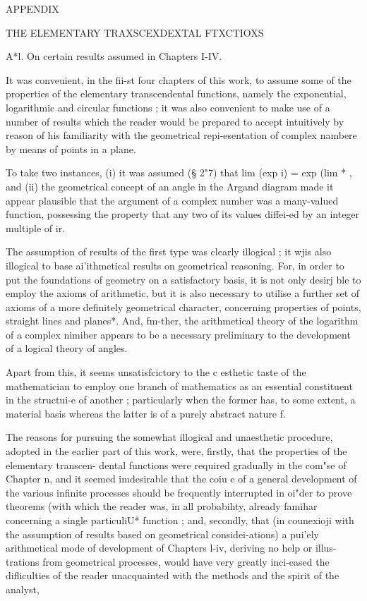 
APPENDIX 

THE ELEMENTARY TRAXSCEXDEXTAL FTXCTIOXS 

A*l. On certain results assumed in Chapters I-IV. 

It was conveuient, in the fii-st four chapters of this work, to assume some of the 
properties of the elementary transcendental functions, namely the exponential, logarithmic 
and circular functions ; it was also convenient to make use of a number of results which 
the reader would be prepared to accept intuitively by reason of his familiarity with the 
geometrical repi-esentation of complex nambere by means of points in a plane. 

To take two instances, (i) it was assumed (§ 2"7) that lim (exp i) = exp (lim * , and 
(ii) the geometrical concept of an angle in the Argand diagram made it appear plausible 
that the argument of a complex number was a many-valued function, possessing the 
property that any two of its values diffei-ed by an integer multiple of  ir. 

The assumption of results of the first type was clearly illogical ; it wjis also illogical to 
base ai'ithmetical results on geometrical reasoning. For, in order to put the foundations 
of geometry on a satisfactory basis, it is not only desirj ble to employ the axioms of 
arithmetic, but it is also necessary to utilise a further set of axioms of a more definitely 
geometrical character, concerning properties of points, straight lines and planes*. And, 
fm-ther, the arithmetical theory of the logarithm of a complex nimiber appears to be 
a necessary preliminary to the development of a logical theory of angles. 

Apart from this, it seems unsatisfcictory to the c esthetic taste of the mathematician to 
employ one branch of mathematics as an essential constituent in the structui-e of another ; 
particularly when the former has, to some extent, a material basis whereas the latter is of 
a purely abstract nature f. 

The reasons for pursuing the somewhat illogical and unaesthetic procedure, adopted in 
the earlier part of this work, were, firstly, that the properties of the elementary transcen- 
dental functions were required gradually in the com"se of Chapter n, and it seemed 
imdesirable that the coiu e of a general development of the various infinite processes 
should be frequently interrupted in oi"der to prove theorems (with which the reader was, 
in all probabihty, already famihar  concerning a single particuliU* function ; and, secondly, 
that (in counexioji with the assumption of results based on geometrical considei-ations) 
a pui'ely arithmetical mode of development of Chapters l-iv, deriving no help or illus- 
trations from geometrical processes, would have very greatly inci-eased the difliculties of 
the reader unacquainted with the methods and the spirit of the analyst, 

